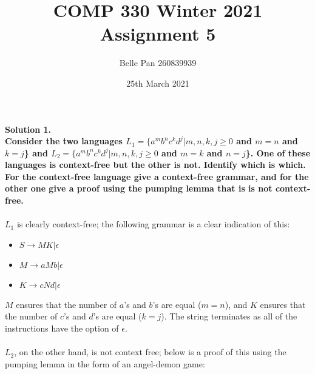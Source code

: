 \documentclass{article}
\title{ COMP 330 Winter 2021 \\ Assignment 5}
\author{Belle Pan 260839939}
\date{25th March 2021}
\begin{document}
\maketitle

\noindent \textbf{Solution 1. 
\\ Consider the two languages \(L_1 = \{a^m b^n c^k d^j | m,n,k,j \geq 0\) and \(m=n\) and \(k=j\)\} and \(L_2 = \{a^m b^n c^k d^j| m,n,k,j \geq 0\) and \(m=k\) and \(n=j\)\}. One of these languages is context-free but the other is not. Identify which is which. For the context-free language give a context-free grammar, and for the other one give a proof using the pumping lemma that is is not context-free.
}
\\
\\
\(L_1\) is clearly context-free; the following grammar is a clear indication of this:
\begin{itemize}
    \item \(S \to MK | \epsilon\)
    \item \(M \to aMb | \epsilon\)
    \item \(K \to cNd | \epsilon\)
\end{itemize}
\(M\) ensures that the number of \(a\)'s and \(b\)'s are equal (\(m=n\)), and \(K\) ensures that the number of \(c\)'s and \(d\)'s are equal (\(k=j\)). The string terminates as all of the instructions have the option of \(\epsilon\).
\\
\\
\(L_2\), on the other hand, is not context free; below is a proof of this using the pumping lemma in the form of an angel-demon game:
\end{document}
